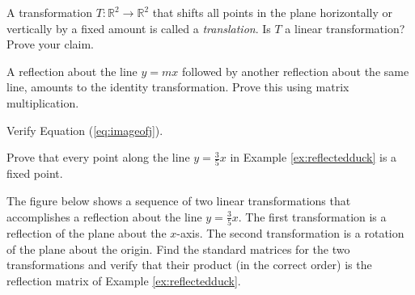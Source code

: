 \documentclass{ximera}
\newcommand{\RR}{\mathbb{R}}
\newcommand{\dfn}{\textit}
\begin{document}
\begin{problem}
A transformation $T:\RR^2\rightarrow \RR^2$ that shifts all points in the plane horizontally or vertically by a fixed amount is called a \dfn{translation}.  Is $T$ a linear transformation?  Prove your claim.
\end{problem}

\begin{problem} A reflection about the line $y=mx$ followed by another reflection about the same line, amounts to the identity transformation.  Prove this using matrix multiplication.
\end{problem}

\begin{problem}
Verify Equation (\ref{eq:imageofj}).
\end{problem}

\begin{problem}\label{prob:fixedpoint}
Prove that every point along the line $y=\frac{3}{5}x$ in Example \ref{ex:reflectedduck} is a fixed point.
\end{problem}

\begin{problem}
The figure below shows a sequence of two linear transformations that accomplishes a reflection about the line $y=\frac{3}{5}x$.  The first transformation is a reflection of the plane about the $x$-axis.  The second transformation is a rotation of the plane about the origin.  Find the standard matrices for the two transformations and verify that their product (in the correct order) is the reflection matrix of Example \ref{ex:reflectedduck}.
\end{problem}
\end{document}
